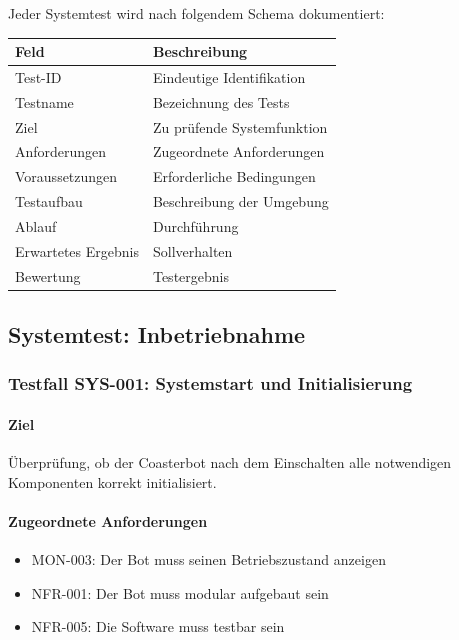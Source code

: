 \documentclass[
  a4paper,
  12pt,
  DIV=12,        %
  parskip=half,  %
  headings=small %
]{scrartcl}
\theoremstyle{definition}
\providecommand{\tightlist}{%
  \setlength{\itemsep}{0pt}\setlength{\parskip}{0pt}}
\theoremstyle{definition}
\begin{document}
Jeder Systemtest wird nach folgendem Schema dokumentiert:

\begin{longtable}[]{@{}ll@{}}
\toprule\noalign{}
Feld & Beschreibung \\
\midrule\noalign{}
\endhead
\bottomrule\noalign{}
\endlastfoot
Test-ID & Eindeutige Identifikation \\
Testname & Bezeichnung des Tests \\
Ziel & Zu prüfende Systemfunktion \\
Anforderungen & Zugeordnete Anforderungen \\
Voraussetzungen & Erforderliche Bedingungen \\
Testaufbau & Beschreibung der Umgebung \\
Ablauf & Durchführung \\
Erwartetes Ergebnis & Sollverhalten \\
Bewertung & Testergebnis \\
\end{longtable}

\subsection{Systemtest: Inbetriebnahme}\label{systemtest-inbetriebnahme}

\subsubsection{Testfall SYS-001: Systemstart und
Initialisierung}\label{testfall-sys-001-systemstart-und-initialisierung}

\paragraph{Ziel}\label{ziel-24}

Überprüfung, ob der Coasterbot nach dem Einschalten alle notwendigen
Komponenten korrekt initialisiert.

\paragraph{Zugeordnete
Anforderungen}\label{zugeordnete-anforderungen-24}

\begin{itemize}
\tightlist
\item
  MON-003: Der Bot muss seinen Betriebszustand anzeigen
\item
  NFR-001: Der Bot muss modular aufgebaut sein
\item
  NFR-005: Die Software muss testbar sein
\end{itemize}
\end{document}
